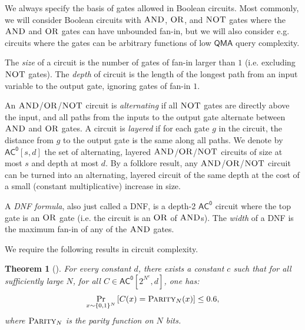 \documentclass[10pt,a4paper]{article}
\newtheorem{theorem}{Theorem}
\newcommand{\AND}{\normalfont\textsc{AND}} %
\newcommand{\OR}{\normalfont\textsc{OR}}
\newcommand{\NOT}{\normalfont\textsc{NOT}}
\newcommand{\PARITY}{\normalfont\textsc{Parity}}
\begin{document}
We always specify the basis of gates allowed in Boolean circuits. Most commonly, we will consider Boolean circuits with $\AND$, $\OR$, and $\NOT$ gates where the $\AND$ and $\OR$ gates can have unbounded fan-in, but we will also consider e.g. circuits where the gates can be arbitrary functions of low $\mathsf{QMA}$ query complexity. 

The \textit{size} of a circuit is the number of gates of fan-in larger than $1$ (i.e. excluding $\NOT$ gates). The \textit{depth} of circuit is the length of the longest path from an input variable to the output gate, ignoring gates of fan-in $1$.

An $\AND$/$\OR$/$\NOT$ circuit is \textit{alternating} if all $\NOT$ gates are directly above the input, and all paths from the inputs to the output gate alternate between $\AND$ and $\OR$ gates. A circuit is \textit{layered} if for each gate $g$ in the circuit, the distance from $g$ to the output gate is the same along all paths. We denote by $\mathsf{AC^0}[s, d]$ the set of alternating, layered $\AND$/$\OR$/$\NOT$ circuits of size at most $s$ and depth at most $d$. By a folklore result, any $\AND$/$\OR$/$\NOT$ circuit can be turned into an alternating, layered circuit of the same depth at the cost of a small (constant multiplicative) increase in size.

A \textit{DNF formula}, also just called a DNF, is a depth-2 $\mathsf{AC^0}$ circuit where the top gate is an $\OR$ gate (i.e. the circuit is an $\OR$ of $\AND$s). The \textit{width} of a DNF is the maximum fan-in of any of the $\AND$ gates.

We require the following results in circuit complexity.
\begin{theorem}[{\cite[Lemma 7.8]{Has87}}]
\label{thm:hastad_parity_ac0_average}
For every constant $d$, there exists a constant $c$ such that for all sufficiently large $N$, for all $C \in \mathsf{AC^0}\left[2^{N^{c}},d \right]$, one has:
\[
\Pr_{x \sim \{0,1\}^N}\left[C(x) = \PARITY_N(x)\right] \le 0.6,
\]
where $\PARITY_N$ is the parity function on $N$ bits.
\end{theorem}
\end{document}
